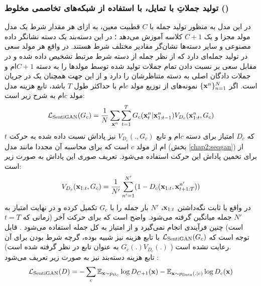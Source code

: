 \subsubsection{
    تولید جملاتِ با تمایل، با استفاده از شبکه‌های تخاصمی مخلوط
     ()\protect{}
}
در این مدل به منظور تولید جمله با $C$ قطبیت معین، به ازای هر مقدار شرط یک مدل مولد مجزا و یک
 $C+1$
کلاسه آموزش می‌دهد \cite{sentigan}؛ در این دسته‌بند یک دسته نشانگر داده مصنوعی و سایر دسته‌ها نشان‌گر مقادیر مختلف شرط هستند. در واقع هر مولد سعی در تولید جمله‌ای دارد که از نظر \classifier{} جمله از دسته شرط مرتبط تشخیص داده شده و در مقابل \classifier{} سعی بر نسبت دادن تمام جملات تولید شده توسط مولد‌ها را به دسته $C+1$ام و جملات دادگان اصلی به دسته متناظرشان را دارد و از این جهت همچنان یک \minmaxgame{} در جریان است. اگر
$\{ {\bf x}^n \}_{n=1}^N$
نمونه‌های از توزیع مولد $c$ام با حداکثر طول $T$ باشد، تابع هزینه مدل مولد $c$ام به شرح زیر است:
\begin{align}
	{\mathcal{L}}_\text{SentiGAN}(G_c) = \frac{1}{N}
	\sum_{{\bf x}^n} \sum_{t=1}^{T}
	G_c({\bf x}^n_t|{\bf x}^n_{1:t-1})
	V_{D_c}({\bf x}^n_{1:t}, G_c)
\end{align}
که $D_c$ امتیاز \discriminator{} برای دسته $c$ام و تابع $V_{D_c}(., G_c)$ نیز پاداش نسبت داده شده به حرکت $t$ام از مولد $c$ است که برای محاسبه آن مجددا مانند مدل  (بخش \ref{chap2:seqgan}) از  \montecarlosearch{} برای تخمین پاداش این حرکت استفاده می‌شود. تعریف صوری این پاداش به صورت زیر است:
\begin{align}
	V_{D_c}({\bf x}_{1:t}, G_c) = \frac{1}{N'} \sum_{n'=1}^{N'} (1 - D_c({\bf x}_{1:t}, {\bf x}^{n'}_{t+1:T}))
\end{align}
در واقع با ثابت نگه‌داشتن ${\bf x}_{1:t}$،
$N'$
بار جمله را با $G_c$ تکمیل کرده و در نهایت امتیاز \discriminator{} به  $N'$ جمله میانگین گرفته می‌شود. واضح است که برای حرکت آخر (زمانی که $t=T$ است) چنین فرآیندی انجام نمی‌گیرد و از امتیاز \discriminator{} به کل جمله استفاده می‌شود \cite{sentigan}. قابل توجه است که ${\mathcal{L}}_\text{SentiGAN}(G_c)$ با تابع هزینه \wgan{} نیز شبیه بوده، گرچه شرط  بودن برای آن رعایت نشده است
( $G_c(.)V_{D_c}(.)$
به عنوان تابع \critic{} در نظر گرفته شده است).
\\
تابع هزینه دسته‌بند نیز به صورت زیر تعریف می‌شود \cite{sentigan}:
\begin{align}
	{\mathcal{L}}_\text{SentiGAN} (D) =
	- \sum_c \mathbb E_{{\bf x} \sim p_{G_c}} \log D_{C+1} ({\bf x})
	- \mathbb E_{{\bf x} \sim p_\text{Data}(.|c)} \log D_c({\bf x})
\end{align}

